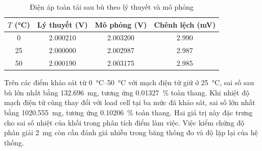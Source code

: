\begin{table}[H]
    \centering
    \caption{Điện áp toàn tải sau bù theo lý thuyết và mô phỏng}
    \label{tab:c4:ly-thuyet-mo-phong}
    \renewcommand{\arraystretch}{1.3}
    \begin{tabular}{|c|c|c|c|}
        \hline
        \textbf{$T$ (\unit{\celsius})} &
        \textbf{Lý thuyết (\unit{\volt})} &
        \textbf{Mô phỏng (\unit{\volt})} &
        \textbf{Chênh lệch (\unit{\milli\volt})} \\ \hline
        0  & 2.000210 & 2.003200 & 2.990 \\ \hline
        25 & 2.000000 & 2.002987 & 2.987 \\ \hline
        50 & 2.000190 & 2.003175 & 2.985 \\ \hline
    \end{tabular}
\end{table}


Trên các điểm khảo sát từ \qtyrange{0}{50}{\celsius} với mạch điện tử
giữ ở \qty{25}{\celsius}, sai số sau bù lớn nhất bằng
\qty{132.696}{\milli\gram}, tương ứng \qty{0.01327}{\percent}
toàn thang. Khi nhiệt độ mạch điện tử cùng thay đổi với load cell tại
ba mức đã khảo sát, sai số lớn nhất bằng \qty{1020.555}{\milli\gram},
tương ứng \qty{0.10206}{\percent} toàn thang. Hai giá trị này đặc trưng
cho sai số nhiệt của khối trong phân tích điểm làm việc. Việc kiểm chứng
độ phân giải \qty{2}{\milli\gram} còn cần đánh giá nhiễu trong băng
thông đo và độ lặp lại của hệ thống.

%
